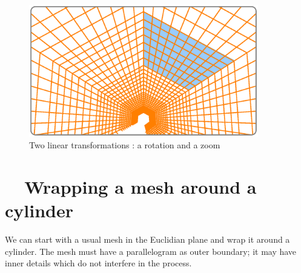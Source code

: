 \begin{figure}[ht] \centering
  \includegraphics[width=100mm]{sector-3.eps}
  \caption{Two linear transformations : a rotation and a zoom}
  \label{\numb section 7.\numb fig 9}
\end{figure}


\section{~~Wrapping a mesh around a cylinder}\label{\numb section 7.\numb parag 14}

We can start with a usual mesh in the Euclidian plane and wrap it around a cylinder.
The mesh must have a parallelogram as outer boundary; it may have inner details
which do not interfere in the process.

